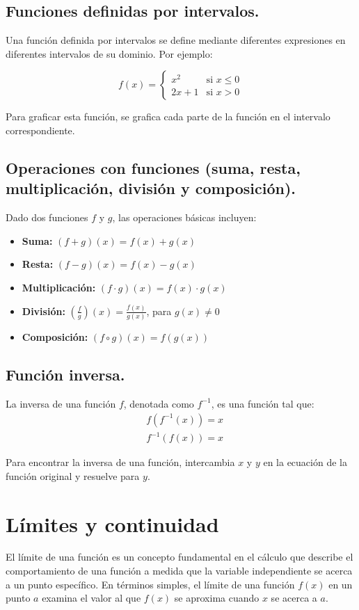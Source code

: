 \subsection{Funciones definidas por intervalos.}
Una función definida por intervalos se define mediante diferentes expresiones en diferentes intervalos de su dominio. Por ejemplo:

\[
f(x) = 
\begin{cases} 
x^2 & \text{si } x \leq 0 \\
2x + 1 & \text{si } x > 0 
\end{cases}
\]

Para graficar esta función, se grafica cada parte de la función en el intervalo correspondiente.



\subsection{Operaciones con funciones (suma, resta, multiplicación, división y composición).}
Dado dos funciones \( f \) y \( g \), las operaciones básicas incluyen:

\begin{itemize}
    \item \textbf{Suma:} \( (f + g)(x) = f(x) + g(x) \)
    \item \textbf{Resta:} \( (f - g)(x) = f(x) - g(x) \)
    \item \textbf{Multiplicación:} \( (f \cdot g)(x) = f(x) \cdot g(x) \)
    \item \textbf{División:} \( \left(\frac{f}{g}\right)(x) = \frac{f(x)}{g(x)} \), para \( g(x) \neq 0 \)
    \item \textbf{Composición:} \( (f \circ g)(x) = f(g(x)) \)
\end{itemize}


\subsection{Función inversa.}
La inversa de una función \( f \), denotada como \( f^{-1} \), es una función tal que:
\begin{align}
    &f(f^{-1}(x)) = x \\
    &f^{-1}(f(x)) = x
\end{align}

Para encontrar la inversa de una función, intercambia \( x \) y \( y \) en la ecuación de la función original y resuelve para \( y \).

\section{Límites y continuidad} %
El límite de una función es un concepto fundamental en el cálculo que describe el comportamiento de una función a medida que la variable independiente se acerca a un punto específico. En términos simples, el límite de una función \( f(x) \) en un punto \( a \) examina el valor al que \( f(x) \) se aproxima cuando \( x \) se acerca a \( a \).
